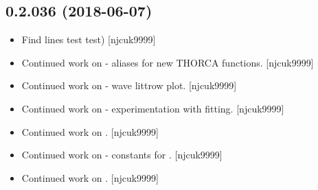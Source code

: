 \documentclass[a4paper,10pt,english]{report}
\begin{document}
\subsection{0.2.036 (2018-06-07)}
\label{\detokenize{misc/changelog:id425}}\begin{itemize}
\item {} 
Find lines test  test) {[}njcuk9999{]}

\item {} 
Continued work on  - aliases for new THORCA functions.
{[}njcuk9999{]}

\item {} 
Continued work on  - wave littrow plot. {[}njcuk9999{]}

\item {} 
Continued work on  - experimentation with fitting. {[}njcuk9999{]}

\item {} 
Continued work on . {[}njcuk9999{]}

\item {} 
Continued work on  - constants for . {[}njcuk9999{]}

\item {} 
Continued work on . {[}njcuk9999{]}

\end{itemize}
\end{document}
